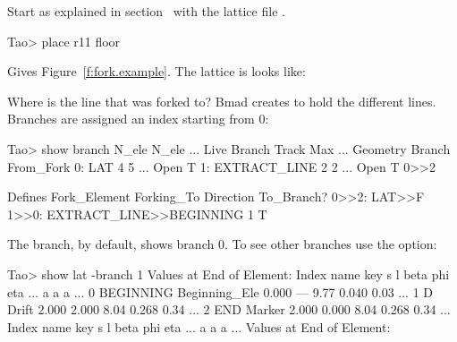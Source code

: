 \documentclass{hitec}
\begin{document}
Start \tao as explained in section~ with the lattice file
.

\begin{code}
Tao> place r11 floor
\end{code}

Gives Figure~\ref{f:fork.example}.
The lattice is looks like:


Where is the line that was forked to? Bmad creates  to hold the different
lines. Branches are assigned an index starting from 0:

\begin{code}
Tao> show branch
                    N_ele  N_ele   ...              Live
  Branch            Track    Max   ...    Geometry  Branch  From_Fork
  0: LAT                4      5   ...    Open       T
  1: EXTRACT_LINE       2      2   ...    Open       T      0>>2
 
                                                                    Defines
  Fork_Element      Forking_To                         Direction    To_Branch?
  0>>2: LAT>>F      1>>0: EXTRACT_LINE>>BEGINNING        1             T
\end{code}  

The  branch, by default, shows branch 0. To see other branches use the  option:
\begin{code}
Tao> show lat -branch 1
      Values at End of Element:
 Index  name      key                     s       l    beta     phi    eta ...
                                                          a       a      a ...
     0  BEGINNING Beginning_Ele       0.000     ---    9.77   0.040   0.03 ...
     1  D         Drift               2.000   2.000    8.04   0.268   0.34 ...
     2  END       Marker              2.000   0.000    8.04   0.268   0.34 ...
 Index  name      key                     s       l    beta     phi    eta ...
                                                          a       a      a ...
      Values at End of Element:
\end{code}
\end{document}
